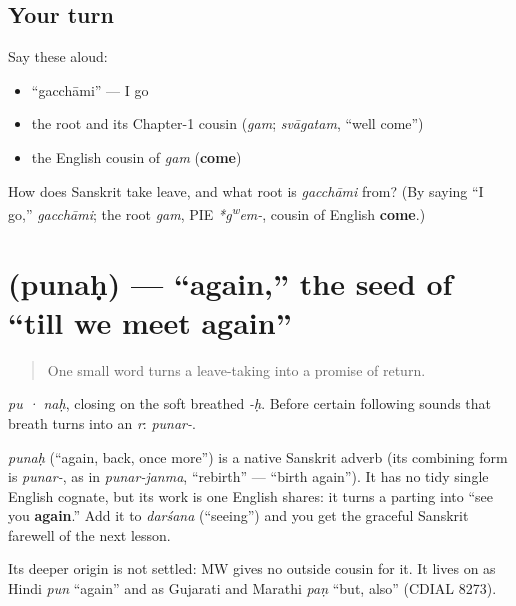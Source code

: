 \subsection*{Your turn}
Say these aloud:

\begin{itemize}
\raggedright
  \item \textquotedblleft{}gacchāmi\textquotedblright{} — I go
  \item the root and its Chapter-1 cousin (\emph{gam}; \emph{svāgatam}, \textquotedblleft{}well come\textquotedblright{})
  \item the English cousin of \emph{gam} (\textbf{come})
\end{itemize}

\begin{tcolorbox}[breakable,colback=teal!4,colframe=teal!35!black,title={Before you move on}]
How does Sanskrit take leave, and what root is \emph{gacchāmi} from? (By saying \textquotedblleft{}I go,\textquotedblright{} \emph{gacchāmi}; the root \emph{gam}, PIE \emph{*g\textsuperscript{w}em-}, cousin of English \textbf{come}.)
\end{tcolorbox}
\section[\texorpdfstring{\sk{पुनः} (punaḥ)}{पुनः (punaḥ)}]{ (punaḥ) — \textquotedblleft{}again,\textquotedblright{} the seed of \textquotedblleft{}till we meet again\textquotedblright{}}

\label{lesson:SA-C04-punah}



\begin{quote}
One small word turns a leave-taking into a promise of return.
\end{quote}

\begin{sounds}
\emph{pu · naḥ}, closing on the soft breathed \emph{-ḥ}. Before certain following sounds that breath turns into an \emph{r}: \emph{punar-}.
\end{sounds}

\begin{cousinweb}
\emph{punaḥ} (\textquotedblleft{}again, back, once more\textquotedblright{}) is a native Sanskrit adverb (its combining form is \emph{punar-}, as in \emph{punar-janma}, \textquotedblleft{}rebirth\textquotedblright{} — \textquotedblleft{}birth again\textquotedblright{}). It has no tidy single English cognate, but its work is one English shares: it turns a parting into \textquotedblleft{}see you \textbf{again}.\textquotedblright{} Add it to \emph{darśana} (\textquotedblleft{}seeing\textquotedblright{}) and you get the graceful Sanskrit farewell of the next lesson.

Its deeper origin is not settled: MW gives no outside cousin for it. It lives on as Hindi \emph{pun} \textquotedblleft{}again\textquotedblright{} and as Gujarati and Marathi \emph{paṇ} \textquotedblleft{}but, also\textquotedblright{} (CDIAL 8273).
\end{cousinweb}

